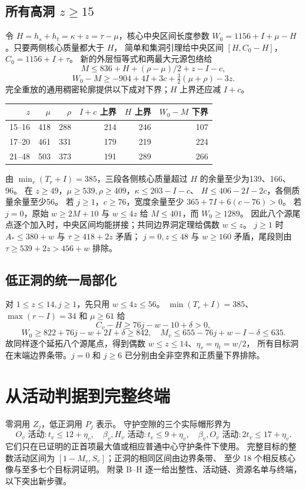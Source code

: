 \documentclass[11pt,a4paper]{article}
\newcommand{\A}{A_*}
\begin{document}
\subsection{所有高洞 $z\ge15$}
令 $H=h_s+h_t=\kappa+z=\tau-\mu$，核心中央区间长度参数
$W_0=1156+I+\mu-H$。只要两侧核心质量都大于 $H$，
简单和集洞引理给中央区间 $[H,C_0-H]$，$C_0=1156+I+\tau$。
新的外层恒等式和两最大元源包络给
\[
 M\le836+H+(\rho-\mu)/2+z-I-c,
\]
\begin{equation}
 W_0-M\ge-904+4I+3c+\tfrac32(\mu+\rho)-3z.
\end{equation}
完全重放的通用稠密轮廓提供以下成对下界；$H$ 上界还应减 $I+c$。
\begin{center}
\begin{tabular}{rrrrrr}\toprule
$z$&$\mu$&$\rho$&$I+c$ 上界&$H$ 上界&$W_0-M$ 下界\\\midrule
15--16&418&288&214&246&107\\
17--20&461&331&179&219&224\\
21--48&503&373&191&289&266\\\bottomrule
\end{tabular}
\end{center}
由 $\min_r(T_r+I)=385$，三段各侧核心质量超过 $H$ 的余量至少为139、166、96。
在 $z\ge49$，$\mu\ge539,\rho\ge409$，$\kappa\le203-I-c$、
$H\le406-2I-2c$，各侧质量余量至少56。
若 $j\ge1$，$c\ge76$，宽度余量至少 $365+7I+6(c-76)>0$。
若 $j=0$，原始 $w\ge2M+10$ 与 $w\le4z$ 给 $M\le401$，而 $W_0\ge1289$。
因此八个源尾点逐个加入时，中央区间均能拼接；共同边界洞定理给偶数 $w\le z$。
$j\ge1$ 时 $\A\le380+w$ 与 $\tau\ge418+2z$ 矛盾；
$j=0,z\le48$ 与 $w\ge160$ 矛盾，尾段则由 $\tau\ge539+2z>456+w$ 排除。

\subsection{低正洞的统一局部化}
对 $1\le z\le14,j\ge1$，先只用 $w\le4z\le56$。
$\min(T_r+I)=385$、$\max(r-I)=34$ 和 $\mu\ge61$ 给
\[
 C_v-H\ge76j-w-10+\delta>0,
\]
\[
 W_0\ge822+76j-w+2I+\delta\ge842,
 \quad M_v\le655-76j+w-I-\delta\le635.
\]
故同样逐个延拓八个源尾点，得到偶数 $w\le z\le14$、$\eta_s=\eta_t=w/2$，
所有目标洞在末端边界条带。$j=0$ 和 $j\ge6$ 已分别由全非空界和正质量下界排除。

\section{从活动判据到完整终端}
零洞用 $Z_j$，低正洞用 $P_j$ 表示。
守护空隙的三个实际帽形界为
\[
 O_v\text{ 活动}:t_v\le12+\eta_v,\quad
 \beta_v,H_v\text{ 活动}:t_v\le9+\eta_v,\quad
 \beta_v,O_v\text{ 活动}:2t_v\le17+\eta_v.
\]
它们只在已证明的正首项最大值或相应普通中心守护条件下使用。
完整目标的整数活动区间为 $[1-M_v,S_v]$；正洞的相同区间由边界条带、
至少 18 个相反核心像与至多七个目标洞证明。
附录 B--H 逐一给出整性、活动链、资源名单与终端，以下突出新步骤。
\end{document}
